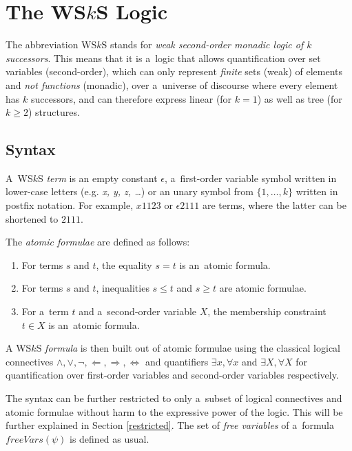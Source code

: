 \begin{example}
\end{example}

\noindent\hrulefill

\chapter{The WS$k$S Logic}\label{wsks}
The abbreviation WS$k$S stands for \emph{weak second-order monadic logic of $k$
successors}. This means that it is a~logic that allows quantification over set
variables (second-order), which can only represent \emph{finite} sets (weak) of
elements and \emph{not functions} (monadic), over a~universe of discourse where
every element has $k$ successors, and can therefore express linear (for $k
= 1$) as well as tree (for $k \geq 2$) structures.
 
 \section{Syntax}
 A~WS$k$S \emph{term} is an empty constant $\epsilon$, a~first-order variable
 symbol written in lower-case letters (e.g. \emph{x, y, z, \ldots}) or an unary
 symbol from $\{1,\ldots,k\}$ written in postfix notation.
 For example, $x1123$ or $\epsilon2111$ are terms, where the latter can be
 shortened to $2111$.

The \emph{atomic formulae} are defined as follows:
 \begin{enumerate}
  \item For terms $s$ and $t$, the equality $s = t$ is an~atomic formula.
\item For terms $s$ and $t$, inequalities $s \leq t$ and $s \geq t$ are atomic
formulae.
\item For a~term $t$ and a~second-order variable $X$, the membership constraint
$t \in X$ is an~atomic formula.
 \end{enumerate}

A WS$k$S \emph{formula} is then built out of atomic formulae using the
classical logical connectives $\wedge, \vee, \neg, \Leftarrow, \Rightarrow,
\Leftrightarrow$ and quantifiers $\exists x, \forall x$ and $\exists X, \forall
X$ for quantification over first-order variables and second-order variables
respectively.

The syntax can be further restricted to only a~subset of logical connectives
and atomic formulae without harm to the expressive power of the logic. This will be
further explained in Section \ref{restricted}. The set of \emph{free variables}
of a~formula $\mathit{freeVars}(\psi)$ is defined as usual.
  
